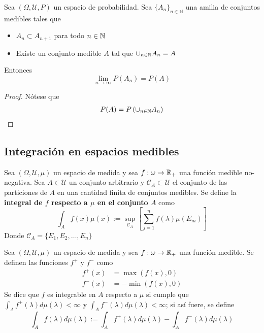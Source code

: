 \begin{proposicion}
Sea $(\Omega,\mathcal{U},P)$ un espacio de probabilidad. Sea $\{ A_n \}_{n\in \mathbb{N}}$ una amilia de conjuntos medibles tales que 
\begin{itemize}
\item $A_n \subset A_{n+1}$ para todo $n \in \mathbb{N}$
\item Existe un conjunto medible $A$ tal que $\cup_{n\in \mathbb{N}} A_n = A$
\end{itemize}
Entonces
\begin{equation}
\lim_{n\rightarrow \infty} P(A_n) = P(A)
\end{equation}
\end{proposicion}
\begin{proof}
Nótese que
\begin{align*}
P(A) &= P\left( \cup_{n\in \mathbb{N}} A_n \right) \\
\end{align*}
\end{proof}

\subsection{Integración en espacios medibles}

\begin{definicion}
Sea $(\Omega, \mathcal{U}, \mu)$ un espacio de medida y sea $f:\omega \rightarrow \mathbb{R}_+$ una función medible no-negativa. Sea $A\in \mathcal{U}$ un conjunto arbitrario y $\mathcal{C}_A \subset \mathcal{U}$ el conjunto de las particiones de $A$ en una cantidad finita de conjuntos medibles.
Se define la \textbf{integral de $f$ respecto a $\mu$ en el conjunto $A$} como
\begin{equation}
\int_A f(x) \mu(x) := \sup_{\mathcal{C}_A} \left[ \sum_{j=1}^{n} f(\lambda) \mu(E_m) \right]
\end{equation}
Donde $\mathcal{C}_A = \{ E_1, E_2, \dots, E_n \}$
\end{definicion}

\begin{definicion}
Sea $(\Omega, \mathcal{U}, \mu)$ un espacio de medida y sea $f:\omega \rightarrow \mathbb{R}_+$ una función medible. Se definen las funciones $f^{+}$ y $f^{-}$ como
\begin{align*}
f^{+}(x) &= \max (f(x), 0 ) \\
f^{-}(x) &= -\min (f(x), 0 )
\end{align*}
Se dice que $f$ es integrable en $A$ respecto a $\mu$ si cumple que $\int_A f^{+}(\lambda) d\mu(\lambda) < \infty$ y $\int_A f^{-}(\lambda) d\mu(\lambda) < \infty$; si así fuere, se define
\begin{equation}
\int_A f(\lambda) d\mu(\lambda) := \int_A f^{+}(\lambda) d\mu(\lambda) - \int_A f^{-}(\lambda) d\mu(\lambda)
\end{equation}
\end{definicion}

